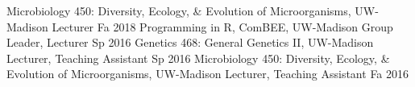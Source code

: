 \newpage


\begin{cvhonors}
  \cvhonor
    {Microbiology 450: Diversity, Ecology, \& Evolution of Microorganisms, UW-Madison}
    {Lecturer}
    {Fa 2018}
  \cvhonor
    {Programming in R, ComBEE, UW-Madison}
    {Group Leader, Lecturer}
    {Sp 2016}
  \cvhonor
    {Genetics 468: General Genetics II, UW-Madison}
    {Lecturer, Teaching Assistant}
    {Sp 2016}
  \cvhonor
    {Microbiology 450: Diversity, Ecology, \& Evolution of Microorganisms, UW-Madison}
    {Lecturer, Teaching Assistant}
    {Fa 2016}
\end{cvhonors}